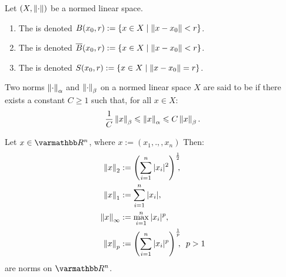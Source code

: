 \begin{definition}
    Let $(X,\lnorm \cdot \rnorm)$ be a normed linear space.
    \begin{enumerate}[label = (\arabic*),itemsep=1pt,topsep=3pt]
        \item The  is denoted \nl $B(x_0,r) := \{x \in X \mid \lnorm x - x_0 \rnorm < r\}$.
        \item The  is denoted \nl $\overline{B}(x_0,r) := \{x \in X \mid \lnorm x - x_0 \rnorm < r\}$.
        \item The  is denoted \nl $S(x_0,r) := \{x \in X \mid \lnorm x - x_0 \rnorm = r\}$.
    \end{enumerate}
\end{definition}

\begin{definition}
    Two norms $\lnorm \cdot \rnorm_\alpha$ and $\lnorm \cdot \rnorm_\beta$ on a normed linear space $X$ are said to be  if there exists a constant $C \geq 1$ such that, for all $x \in X$:
        \begin{equation*}
            \frac{1}{C} \lnorm x \rnorm_\beta \leq \lnorm x \rnorm_\alpha \leq C \lnorm x \rnorm_\beta.
        \end{equation*}
\end{definition}

\begin{example}
    Let $x \in \bfR^n$, where $x := (x_1,.,,x_n)$ Then:
        \begin{equation*}
        \begin{split}
            \lnorm x \rnorm_2 & := \left( \sum_{i = 1}^n |x_i|^2 \right)^\frac{1}{2}\hspace{-5pt},\\
            \lnorm x \rnorm_1 & := \sum_{i = 1}^n |x_i|,\\
            \lnorm x \rnorm_\infty & :=  \max_{i = 1}^n |x_i|^p, \\
            \lnorm x \rnorm_p & := \left( \sum_{i = 1}^n |x_i|^p \right)^\frac{1}{p}\hspace{-5pt},\h5 p > 1\\
        \end{split}
        \end{equation*}
    are norms on $\bfR^n$.
\end{example}


